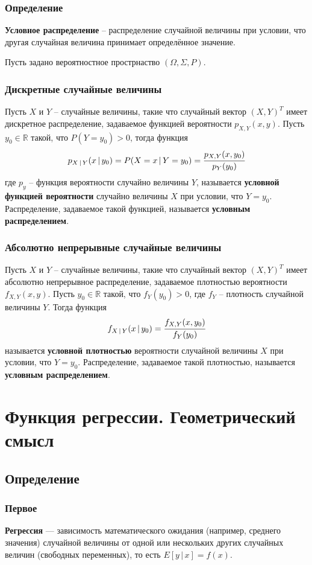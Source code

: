 \documentclass{article}
\newcommand{\R}{\mathbb{R}}
\begin{document}
\subsubsection{Определение}
\textbf{Условное распределение} -- распределение случайной величины при условии, что другая случайная величина принимает определённое значение.

Пусть задано вероятностное прострнаство $(\Omega,\Sigma,P)$.
\subsubsection{Дискретные случайные величины}
Пусть $X$ и $Y$ -- случайные величины, такие что случайный вектор $(X,Y)^T$ имеет дискретное распределение, задаваемое функцией вероятности $p_{X,Y}(x,y)$. Пусть $y_0\in\R$ такой, что $P(Y=y_0)>0$, тогда функция
$$ p_{X\,|\,Y}(x\,|\,y_0)=P(X=x\,|\,Y=y_0)=\cfrac{p_{X,Y}(x,y_0)}{p_Y(y_0)} $$
где $p_y$ -- функция вероятности случайно величины $Y$, называется \textbf{условной функцией вероятности} случайно величины $X$ при условии, что $Y=y_0$. Распределение, задаваемое такой функцией, называется \textbf{условным распределением}.
\subsubsection{Абсолютно непрерывные случайные величины}
Пусть $X$ и $Y$ -- случайные величины, такие что случайный вектор $(X,Y)^T$ имеет абсолютно непрерывное распределение, задаваемое плотностью вероятности $f_{X,Y}(x,y)$. Пусть $y_0\in\R$ такой, что $f_Y(y_0)>0$, где $f_Y$ -- плотность случайной величины $Y$. Тогда функция
$$ f_{X\,|\,Y}(x\,|\,y_0)=\cfrac{f_{X,Y}(x,y_0)}{f_Y(y_0)} $$
называется \textbf{условной плотностью} вероятности случайной величины $X$ при условии, что $Y=y_0$. Распределение, задаваемое такой плотностью, называется \textbf{условным распределением}.
\newpage
\section{Функция регрессии. Геометрический смысл}
\subsection{Определение}
\subsubsection{Первое}
\textbf{Регрессия} — зависимость математического ожидания (например, среднего значения) случайной величины от одной или нескольких других случайных величин (свободных переменных), то есть $E[y\,|\,x]=f(x)$.
\end{document}
